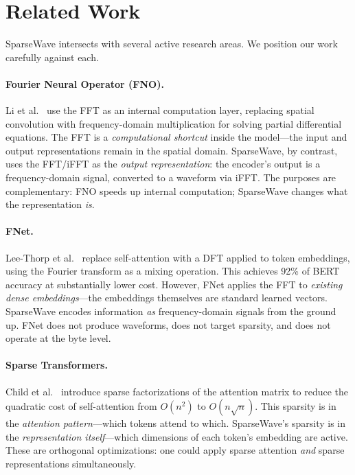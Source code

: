 \documentclass[10pt,twocolumn]{article}
\begin{document}
\section{Related Work}

SparseWave intersects with several active research areas. We position our work carefully against each.

\paragraph{Fourier Neural Operator (FNO).} Li et al.\ \cite{li2021fourier} use the FFT as an internal computation layer, replacing spatial convolution with frequency-domain multiplication for solving partial differential equations. The FFT is a \emph{computational shortcut} inside the model---the input and output representations remain in the spatial domain. SparseWave, by contrast, uses the FFT/iFFT as the \emph{output representation}: the encoder's output is a frequency-domain signal, converted to a waveform via iFFT. The purposes are complementary: FNO speeds up internal computation; SparseWave changes what the representation \emph{is}.

\paragraph{FNet.} Lee-Thorp et al.\ \cite{leethorp2022fnet} replace self-attention with a DFT applied to token embeddings, using the Fourier transform as a mixing operation. This achieves 92\% of BERT accuracy at substantially lower cost. However, FNet applies the FFT to \emph{existing dense embeddings}---the embeddings themselves are standard learned vectors. SparseWave encodes information \emph{as} frequency-domain signals from the ground up. FNet does not produce waveforms, does not target sparsity, and does not operate at the byte level.

\paragraph{Sparse Transformers.} Child et al.\ \cite{child2019generating} introduce sparse factorizations of the attention matrix to reduce the quadratic cost of self-attention from $O(n^2)$ to $O(n\sqrt{n})$. This sparsity is in the \emph{attention pattern}---which tokens attend to which. SparseWave's sparsity is in the \emph{representation itself}---which dimensions of each token's embedding are active. These are orthogonal optimizations: one could apply sparse attention \emph{and} sparse representations simultaneously.
\end{document}
